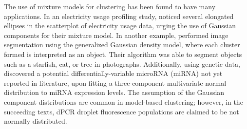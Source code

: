The use of mixture models for clustering has been found to have many applications. In an electricity usage profiling study,  noticed several elongated ellipses in the scatterplot of electricity usage data, urging the use of Gaussian components for their mixture model. In another example, \cite{Choy2017} performed image segmentation using the generalized Gaussian density model, where each cluster formed is interpreted as an object. Their algorithm was able to segment objects such as a starfish, cat, or tree in photographs. Additionally, using genetic data,  discovered a potential differentially-variable microRNA (miRNA) not yet reported in literature, upon fitting a three-component multivariate normal distribution to miRNA expression levels. The assumption of the Gaussian component distributions are common in model-based clustering; however, in the succeeding texts, dPCR droplet fluorescence populations are claimed to be not normally distributed. 

